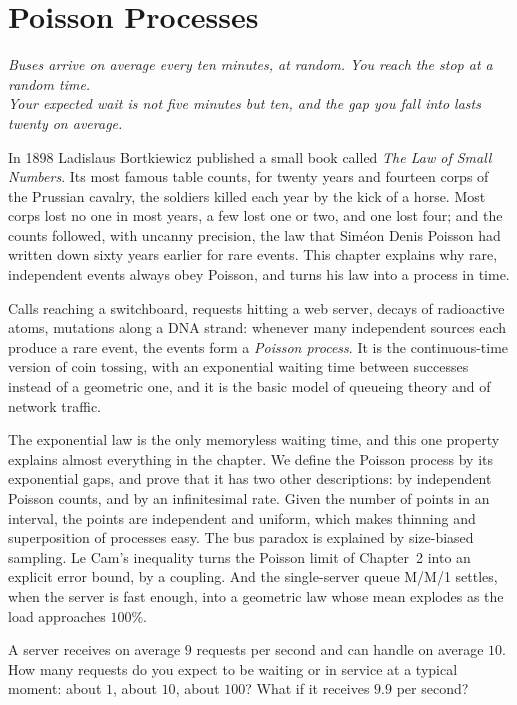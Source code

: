 \chapter{Poisson Processes}

\begin{center}\itshape
Buses arrive on average every ten minutes, at random. You reach the stop at a random time.\\
Your expected wait is not five minutes but ten, and the gap you fall into lasts twenty on average.
\end{center}

In 1898 Ladislaus Bortkiewicz published a small book called \emph{The Law of Small Numbers}. Its most famous table counts, for twenty years and
fourteen corps of the Prussian cavalry, the soldiers killed each year by the kick of a horse. Most corps lost no one in most years, a few lost one or
two, and one lost four; and the counts followed, with uncanny precision, the law that Sim\'eon Denis Poisson had written down sixty years earlier for
rare events. This chapter explains why rare, independent events always obey Poisson, and turns his law into a process in time.

Calls reaching a switchboard, requests hitting a web server, decays of radioactive atoms, mutations along a DNA
strand: whenever many independent sources each produce a rare event, the events form a \emph{Poisson process}. It is the
continuous-time version of coin tossing, with an exponential waiting time between successes instead of a geometric
one, and it is the basic model of queueing theory and of network traffic.

The exponential law is the only memoryless waiting time, and this one property explains almost everything in the
chapter. We define the Poisson process by its exponential gaps, and prove that it has two other descriptions: by
independent Poisson counts, and by an infinitesimal rate. Given the number of points in an interval, the points are
independent and uniform, which makes thinning and superposition of processes easy. The bus paradox is explained by
size-biased sampling. Le Cam's inequality turns the Poisson limit of Chapter~2 into an explicit error bound, by a
coupling. And the single-server queue M/M/1 settles, when the server is fast enough, into a geometric law whose mean
explodes as the load approaches $100\%$.

\begin{think}
A server receives on average $9$ requests per second and can handle on average $10$. How many requests do you expect to
be waiting or in service at a typical moment: about $1$, about $10$, about $100$? What if it receives $9.9$ per second?
\end{think}

